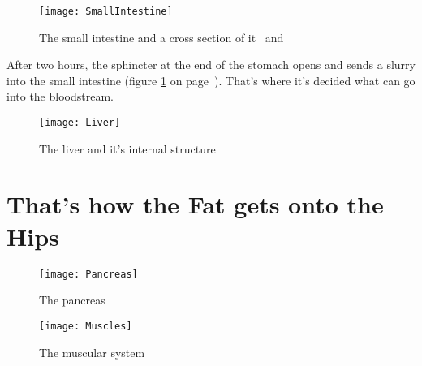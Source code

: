 \documentclass[../main.tex]{subfiles}
\begin{document}
\begin{figure}[htb!]
  \texttt{[image: SmallIntestine]}
  \caption{The small intestine and a cross section of it~\cite{SmallInt} and~\cite{LayersInt}}\label{SmallInt}
  \end{figure}


 
After two hours, the sphincter at the end of the stomach opens and sends a slurry into the small intestine
(figure \ref{SmallInt} on page~\pageref{SmallInt}).
That's where it's decided what can go into the bloodstream.


\begin{figure}[htb!]
  \texttt{[image: Liver]}
  \caption{The liver and it's internal structure~\cite{Liver}}\label{liver}
  \end{figure}


  \section{That's how the Fat gets onto the Hips}

  \begin{figure}[htb!]
    \begin{center}
  \texttt{[image: Pancreas]}
  \caption{The pancreas~\cite{Pancreas2}}\label{pancreas}
  \end{center}
  \end{figure}

  \begin{figure}[htb!]
    \begin{center}
  \texttt{[image: Muscles]}
  \caption{The muscular system~\cite{MusclesBougle}}\label{muscles}
  \end{center}
  \end{figure}
\end{document}
